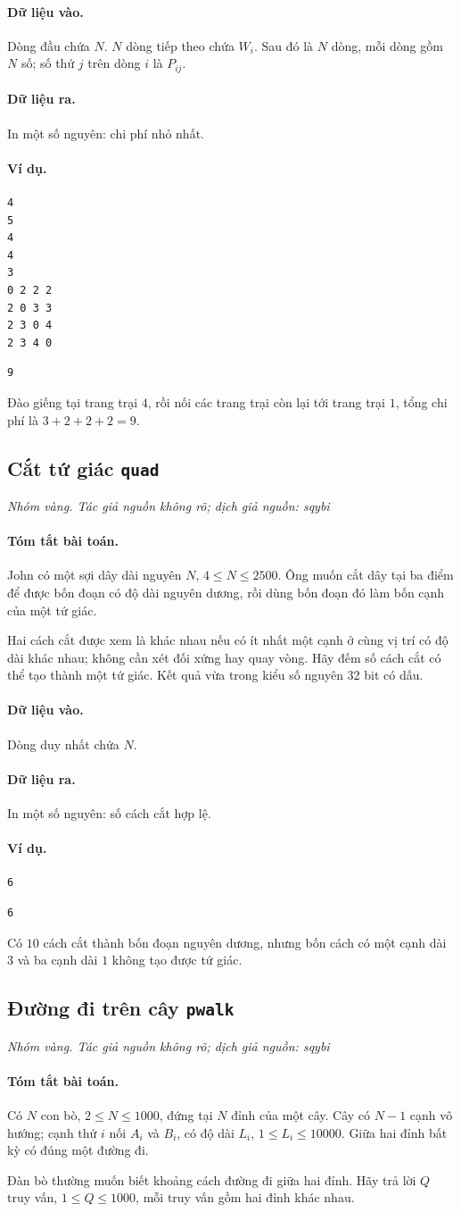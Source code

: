 \documentclass[11pt]{article}
\newcommand{\problem}[4]{%
  \subsection[#1 (#2)]{#1 \hfill {\normalsize\texttt{#2}}}%
  \noindent\textit{#3. #4}\par\smallskip
}
\newcommand{\iosec}[1]{\paragraph{#1}}
\begin{document}
\iosec{Dữ liệu vào.}
Dòng đầu chứa \(N\). \(N\) dòng tiếp theo chứa \(W_i\). Sau đó là \(N\) dòng,
mỗi dòng gồm \(N\) số; số thứ \(j\) trên dòng \(i\) là \(P_{ij}\).

\iosec{Dữ liệu ra.}
In một số nguyên: chi phí nhỏ nhất.

\iosec{Ví dụ.}
\begin{verbatim}
4
5
4
4
3
0 2 2 2
2 0 3 3
2 3 0 4
2 3 4 0
\end{verbatim}

\begin{verbatim}
9
\end{verbatim}

Đào giếng tại trang trại \(4\), rồi nối các trang trại còn lại tới trang trại
\(1\), tổng chi phí là \(3+2+2+2=9\).

\problem{Cắt tứ giác}{quad}{Nhóm vàng}{Tác giả nguồn không rõ; dịch giả nguồn: sqybi}

\iosec{Tóm tắt bài toán.}
John có một sợi dây dài nguyên \(N\), \(4\le N\le 2500\). Ông muốn cắt dây
tại ba điểm để được bốn đoạn có độ dài nguyên dương, rồi dùng bốn đoạn đó làm
bốn cạnh của một tứ giác.

Hai cách cắt được xem là khác nhau nếu có ít nhất một cạnh ở cùng vị trí có
độ dài khác nhau; không cần xét đối xứng hay quay vòng. Hãy đếm số cách cắt
có thể tạo thành một tứ giác. Kết quả vừa trong kiểu số nguyên 32 bit có dấu.

\iosec{Dữ liệu vào.}
Dòng duy nhất chứa \(N\).

\iosec{Dữ liệu ra.}
In một số nguyên: số cách cắt hợp lệ.

\iosec{Ví dụ.}
\begin{verbatim}
6
\end{verbatim}

\begin{verbatim}
6
\end{verbatim}

Có \(10\) cách cắt thành bốn đoạn nguyên dương, nhưng bốn cách có một cạnh
dài \(3\) và ba cạnh dài \(1\) không tạo được tứ giác.

\problem{Đường đi trên cây}{pwalk}{Nhóm vàng}{Tác giả nguồn không rõ; dịch giả nguồn: sqybi}

\iosec{Tóm tắt bài toán.}
Có \(N\) con bò, \(2\le N\le 1000\), đứng tại \(N\) đỉnh của một cây. Cây có
\(N-1\) cạnh vô hướng; cạnh thứ \(i\) nối \(A_i\) và \(B_i\), có độ dài
\(L_i\), \(1\le L_i\le 10000\). Giữa hai đỉnh bất kỳ có đúng một đường đi.

Đàn bò thường muốn biết khoảng cách đường đi giữa hai đỉnh. Hãy trả lời
\(Q\) truy vấn, \(1\le Q\le 1000\), mỗi truy vấn gồm hai đỉnh khác nhau.
\end{document}
